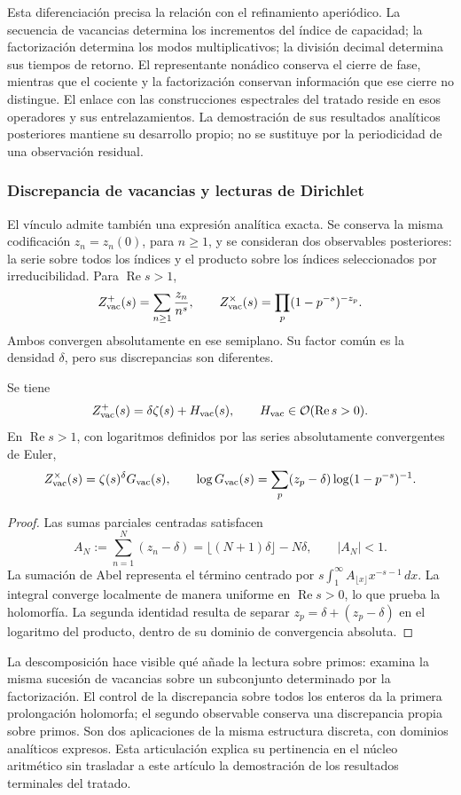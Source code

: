 Esta diferenciación precisa la relación con el refinamiento aperiódico.
La secuencia de vacancias determina los incrementos del índice de
capacidad; la factorización determina los modos multiplicativos; la
división decimal determina sus tiempos de retorno. El representante
nonádico conserva el cierre de fase, mientras que el cociente y la
factorización conservan información que ese cierre no distingue. El
enlace con las construcciones espectrales del tratado reside en esos
operadores y sus entrelazamientos. La demostración de sus resultados
analíticos posteriores mantiene su desarrollo propio; no se sustituye por
la periodicidad de una observación residual.

\subsubsection{Discrepancia de vacancias y lecturas de Dirichlet}

El vínculo admite también una expresión analítica exacta. Se conserva la
misma codificación \(z_n=z_n(0)\), para \(n\geq1\), y se consideran
dos observables posteriores: la serie sobre todos los índices y el
producto sobre los índices seleccionados por irreducibilidad. Para
\(\operatorname{Re}s>1\),
\[
 Z_{\rm vac}^{+}(s)=\sum_{n\geq1}\frac{z_n}{n^s},\qquad
 Z_{\rm vac}^{\times}(s)=\prod_p(1-p^{-s})^{-z_p}.
\]
Ambos convergen absolutamente en ese semiplano. Su factor común es la
densidad \(\delta\), pero sus discrepancias son diferentes.

\begin{proposition}
Se tiene
\[
 Z_{\rm vac}^{+}(s)=\delta\zeta(s)+H_{\rm vac}(s),
 \qquad H_{\rm vac}\in\mathcal O(\operatorname{Re}s>0).
\]
En \(\operatorname{Re}s>1\), con logaritmos definidos por las series
absolutamente convergentes de Euler,
\[
 Z_{\rm vac}^{\times}(s)=\zeta(s)^\delta G_{\rm vac}(s),\qquad
 \log G_{\rm vac}(s)=
 \sum_p(z_p-\delta)\log(1-p^{-s})^{-1}.
\]
\end{proposition}
\begin{proof}
Las sumas parciales centradas satisfacen
\[
 A_N:=\sum_{n=1}^N(z_n-\delta)
 =\lfloor(N+1)\delta\rfloor-N\delta,\qquad |A_N|<1.
\]
La sumación de Abel representa el término centrado por
\(s\int_1^\infty A_{\lfloor x\rfloor}x^{-s-1}\,dx\). La integral
converge localmente de manera uniforme en \(\operatorname{Re}s>0\),
lo que prueba la holomorfía. La segunda identidad resulta de separar
\(z_p=\delta+(z_p-\delta)\) en el logaritmo del producto, dentro de
su dominio de convergencia absoluta.
\end{proof}

La descomposición hace visible qué añade la lectura sobre primos: examina
la misma sucesión de vacancias sobre un subconjunto determinado por la
factorización. El control de la discrepancia sobre todos los enteros da
la primera prolongación holomorfa; el segundo observable conserva una
discrepancia propia sobre primos. Son dos aplicaciones de la misma
estructura discreta, con dominios analíticos expresos. Esta articulación
explica su pertinencia en el núcleo aritmético sin trasladar a este
artículo la demostración de los resultados terminales del tratado.


